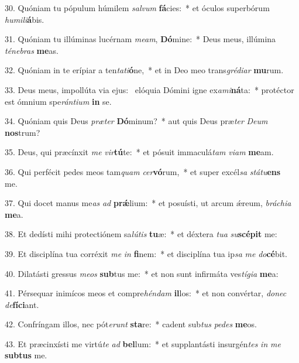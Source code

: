 30. Quóniam tu pópulum húmilem \textit{sal}\textit{vum} \textbf{fá}cies:~*  et óculos superbórum \textit{hu}\textit{mi}\textit{li}\textbf{á}bis.\

31. Quóniam tu illúminas lucérnam \textit{me}\textit{am}, \textbf{Dó}mine:~*  Deus meus, illúmina \textit{té}\textit{ne}\textit{bras} \textbf{me}as.\

32. Quóniam in te erípiar a ten\textit{ta}\textit{ti}\textbf{ó}ne,~*  et in Deo meo trans\textit{gré}\textit{di}\textit{ar} \textbf{mu}rum.\

33. Deus meus, impollúta via ejus: \dag\  elóquia Dómini igne ex\textit{a}\textit{mi}\textbf{ná}ta:~*  protéctor est ómnium spe\textit{rán}\textit{ti}\textit{um} \textbf{in} se.\

34. Quóniam quis Deus \textit{præ}\textit{ter} \textbf{Dó}minum?~*  aut quis Deus præ\textit{ter} \textit{De}\textit{um} \textbf{nos}trum?\

35. Deus, qui præcínxit \textit{me} \textit{vir}\textbf{tú}te:~*  et pósuit immaculá\textit{tam} \textit{vi}\textit{am} \textbf{me}am.\

36. Qui perfécit pedes meos tam\textit{quam} \textit{cer}\textbf{vó}rum,~*  et super excél\textit{sa} \textit{stá}\textit{tu}\textbf{ens} me.\

37. Qui docet manus me\textit{as} \textit{ad} \textbf{prǽ}lium:~*  et posuísti, ut arcum ǽreum, \textit{brá}\textit{chi}\textit{a} \textbf{me}a.\

38. Et dedísti mihi protectiónem sa\textit{lú}\textit{tis} \textbf{tu}æ:~*  et déxtera \textit{tu}\textit{a} \textit{su}\textbf{scé}\textbf{pit} me:\

39. Et disciplína tua corréxit \textit{me} \textit{in} \textbf{fi}nem:~*  et disciplína tua ip\textit{sa} \textit{me} \textit{do}\textbf{cé}bit.\

40. Dilatásti gressus \textit{me}\textit{os} \textbf{sub}tus me:~*  et non sunt infirmáta ves\textit{tí}\textit{gi}\textit{a} \textbf{me}a:\

41. Pérsequar inimícos meos et compre\textit{hén}\textit{dam} \textbf{il}los:~*  et non convértar, \textit{do}\textit{nec} \textit{de}\textbf{fí}\textbf{ci}ant.\

42. Confríngam illos, nec pót\textit{e}\textit{runt} \textbf{sta}re:~*  cadent sub\textit{tus} \textit{pe}\textit{des} \textbf{me}os.\

43. Et præcinxísti me virtú\textit{te} \textit{ad} \textbf{bel}lum:~*  et supplantásti insurgén\textit{tes} \textit{in} \textit{me} \textbf{sub}\textbf{tus} me.\

